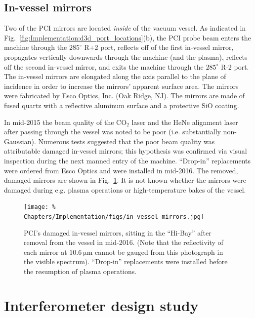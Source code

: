 \subsection{In-vessel mirrors}
Two of the PCI mirrors are located
\emph{inside} of the \diiid \space vacuum vessel.
As indicated in Fig.~\ref{fig:Implementation:d3d_port_locations}(b),
the PCI probe beam enters the machine through the $285^{\circ}$ R+2 port,
reflects off of the first in-vessel mirror,
propagates vertically downwards through the machine (and the plasma),
reflects off the second in-vessel mirror, and
exits the machine through the $285^{\circ}$ R-2 port.
The in-vessel mirrors are elongated
along the axis parallel to the plane of incidence
in order to increase the mirrors' apparent surface area.
The mirrors were fabricated by Esco Optics, Inc. (Oak Ridge, NJ).
The mirrors are made of fused quartz with
a reflective aluminum surface and a protective SiO coating.

In mid-2015 the beam quality of the CO$_2$ laser and the HeNe alignment laser
after passing through the \diiid \space vessel was noted to be poor
(i.e. substantially non-Gaussian).
Numerous tests suggested that the poor beam quality was attributable
damaged in-vessel mirrors;
this hypothesis was confirmed via visual inspection
during the next manned entry of the machine.
``Drop-in'' replacements were ordered from Esco Optics
and were installed in mid-2016.
The removed, damaged mirrors are shown in
Fig.~\ref{fig:Implementation:in_vessel_mirrors}.
It is not known whether the mirrors were damaged
during e.g. plasma operations or high-temperature bakes of the vessel.

\begin{figure}
  \centering
  \texttt{[image: \%
    Chapters/Implementation/figs/in\_vessel\_mirrors.jpg]}
  \caption[PCI's damaged in-vessel mirrors]{%
    PCI's damaged in-vessel mirrors, sitting
    in the \diiid \space ``Hi-Bay''
    after removal from the vessel in mid-2016.
    (Note that the reflectivity of each mirror at $\SI{10.6}{\micro\meter}$
    cannot be gauged from this photograph in the visible spectrum).
    ``Drop-in'' replacements were installed
    before the resumption of plasma operations.}
\label{fig:Implementation:in_vessel_mirrors}
\end{figure}


\section{Interferometer design study}


